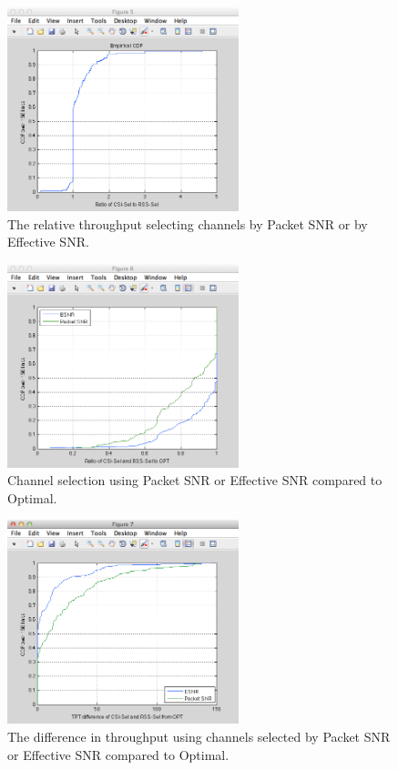 \begin{figure}[htp]
	\centering
	\includegraphics[width=0.6\textwidth]{figures/esnr/chan_sel_ratio.png}
	\caption{\label{fig:chan_sel_ratio}The relative throughput selecting channels by Packet SNR or by Effective SNR\@.}
\end{figure}

\begin{figure}[htp]
	\centering
	\includegraphics[width=0.6\textwidth]{figures/esnr/chan_sel_ratio_opt.png}
	\caption{\label{fig:chan_sel_ratio_opt}Channel selection using Packet SNR or Effective SNR compared to Optimal.}
\end{figure}

\begin{figure}[htp]
	\centering
	\includegraphics[width=0.6\textwidth]{figures/esnr/chan_sel_delta_opt.png}
	\caption{\label{fig:chan_sel_delta_opt}The difference in throughput using channels selected by Packet SNR or Effective SNR compared to Optimal.}
\end{figure}

